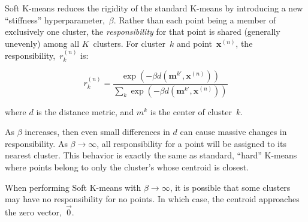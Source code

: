 \documentclass{report}
\begin{document}
  Soft K-means reduces the rigidity of the standard K-means by introducing a new ``stiffness'' hyperparameter,~$\beta$.  Rather than each point being a member of exclusively one cluster, the \textit{responsibility} for that point is shared (generally unevenly) among all $K$~clusters.  For cluster~$k$ and point~$\textbf{x}^{(n)}$, the responsibility,~$r_{k}^{(n)}$ is:

  \begin{equation}
    r_k^{(n)} = \frac{\exp(-\beta d(\textbf{m}^{k'}, \textbf{x}^{(n)}))}{\sum_{k} \exp(-\beta d(\textbf{m}^{k'}, \textbf{x}^{(n)}))}
  \end{equation}

  \noindent
  where $d$ is the distance metric, and $m^{k}$ is the center of cluster~$k$.

  As $\beta$ increases, then even small differences in $d$ can cause massive changes in responsibility.  As ${\beta \rightarrow \infty}$, all responsibility for a point will be assigned to its nearest cluster.  This behavior is exactly the same as standard, ``hard'' K-means where points belong to only the cluster's whose centroid is closest.

  When performing Soft K-means with ${\beta \rightarrow \infty}$, it is possible that some clusters may have no responsibility for no points.  In which case, the centroid approaches the zero vector,~$\vec{0}$.
\end{document}
